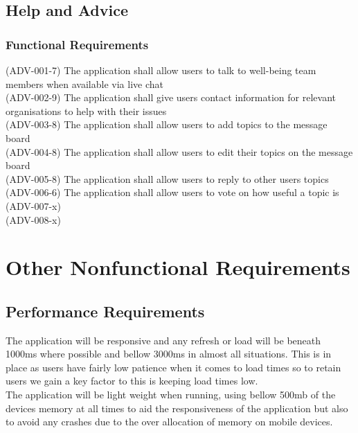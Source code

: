 \documentclass[a4paper]{article}
\begin{document}
\subsection{Help and Advice}
\subsubsection*{Functional Requirements}
	(ADV-001-7) The application shall allow users to talk to well-being team members when available via live chat\\
	(ADV-002-9) The application shall give users contact information for relevant organisations to help with their issues\\
	(ADV-003-8) The application shall allow users to add topics to the message board\\
	(ADV-004-8) The application shall allow users to edit their topics on the message board\\
	(ADV-005-8) The application shall allow users to reply to other users topics\\
	(ADV-006-6) The application shall allow users to vote on how useful a topic is\\
	(ADV-007-x) \\
	(ADV-008-x) \\	

\section {Other Nonfunctional Requirements}
\subsection {Performance Requirements}
The application will be responsive and any refresh or load will be beneath 1000ms where possible and bellow 3000ms in almost all situations. This is in place as users have fairly low patience when it comes to load times so to retain users we gain a key factor to this is keeping load times low. \\

\noindent The application will be light weight when running, using bellow 500mb of the devices memory at all times to aid the responsiveness of the application but also to avoid any crashes due to the over allocation of memory on mobile devices.
\pagebreak
\end{document}
